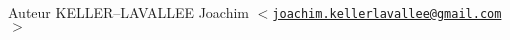 \begin{DoxyAuthor}{Auteur}
K\+E\+L\+L\+ER--L\+A\+V\+A\+L\+L\+EE Joachim $<$\href{mailto:joachim.kellerlavallee@gmail.com}{\tt joachim.\+kellerlavallee@gmail.\+com}$>$ 
\end{DoxyAuthor}

